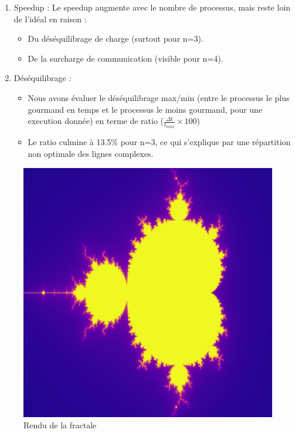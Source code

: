 \documentclass[a4paper,13pt]{book}
\begin{document}
\begin{enumerate}
\item Speedup :
Le speedup augmente avec le nombre de processus, mais reste loin de l’idéal en raison :
\begin{itemize}
\item Du déséquilibrage de charge (surtout pour n=3).
\item De la surcharge de communication (visible pour n=4).
\end{itemize}
\item Déséquilibrage :
\begin{itemize}
\item Nous avons évaluer le déséquilibrage max/min (entre le processus le plus gourmand en temps et le processus le moins gourmand, pour une execution donnée) en terme de ratio ($\frac{\Delta t}{t_{max}}\times 100$)
\item Le ratio culmine à 13.5\% pour n=3, ce qui s’explique par une répartition non optimale des lignes complexes.
\end{itemize}
\end{enumerate}
\begin{figure}[ht]
\begin{center}
  \includegraphics[scale=0.2]{./fractale.PNG}
  \caption{Rendu de la fractale}
\end{center}
\end{figure}
\end{document}
